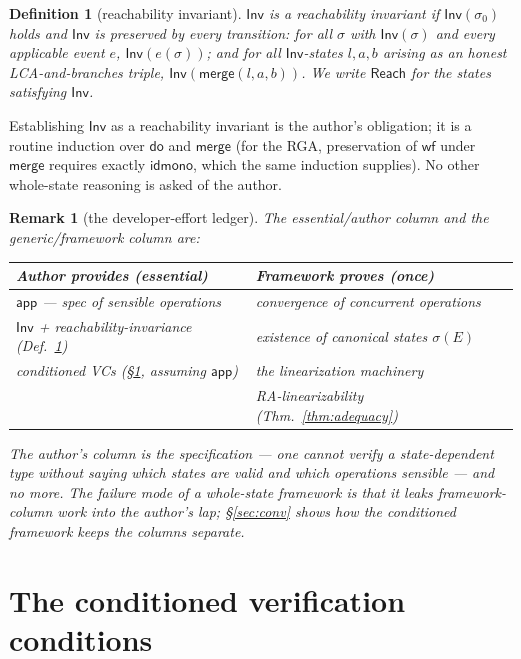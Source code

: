\documentclass[11pt]{article}
\newtheorem{definition}[theorem]{Definition}
\newtheorem{remark}[theorem]{Remark}
\newcommand{\Merge}{\mathsf{merge}}
\newcommand{\Sinit}{\sigma_0}
\newcommand{\dolab}{\mathsf{do}}
\newcommand{\Inv}{\mathsf{Inv}}
\newcommand{\app}{\mathsf{app}}
\newcommand{\reach}{\mathsf{Reach}}
\begin{document}
\begin{definition}[reachability invariant]
\label{def:reach}
$\Inv$ is a \emph{reachability invariant} if $\Inv(\Sinit)$ holds and $\Inv$ is
preserved by every transition: for all $\sigma$ with $\Inv(\sigma)$ and every
applicable event $e$, $\Inv(e(\sigma))$; and for all $\Inv$-states $l,a,b$
arising as an honest LCA-and-branches triple, $\Inv(\Merge(l,a,b))$. We write
$\reach$ for the states satisfying $\Inv$.
\end{definition}

Establishing $\Inv$ as a reachability invariant is the author's obligation; it is
a routine induction over $\dolab$ and $\Merge$ (for the RGA, preservation of
$\mathsf{wf}$ under $\Merge$ requires exactly $\mathsf{idmono}$, which the same
induction supplies). No other whole-state reasoning is asked of the author.

\begin{remark}[the developer-effort ledger]
\label{rem:ledger}
The essential/author column and the generic/framework column are:
\begin{center}\small
\begin{tabular}{@{}p{}p{}@{}}
\toprule
Author provides (essential) & Framework proves (once) \\
\midrule
$\app$ --- spec of sensible operations & convergence of concurrent operations \\
$\Inv$ + reachability-invariance (Def.~\ref{def:reach}) & existence of canonical
  states $\sigma(E)$ \\
conditioned VCs (\S\ref{sec:vcs}, assuming $\app$) & the linearization machinery \\
& RA-linearizability (Thm.~\ref{thm:adequacy}) \\
\bottomrule
\end{tabular}
\end{center}
The author's column is the \emph{specification} --- one cannot verify a
state-dependent type without saying which states are valid and which operations
sensible --- and no more. The failure mode of a whole-state framework is that it
leaks framework-column work into the author's lap; \S\ref{sec:conv} shows how the
conditioned framework keeps the columns separate.
\end{remark}

\section{The conditioned verification conditions}
\label{sec:vcs}
\end{document}
